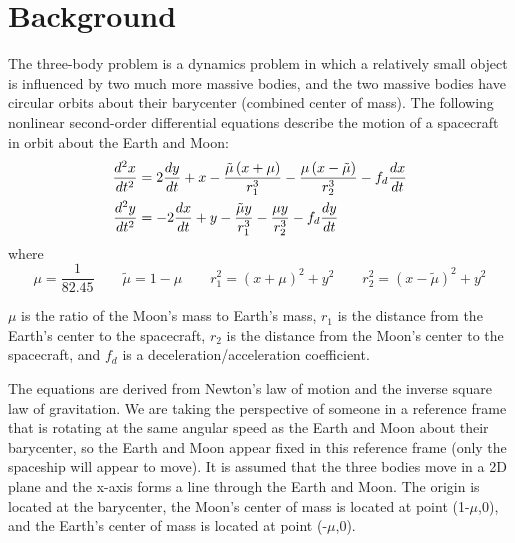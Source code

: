\section{Background}

The \color{magenta} three-body problem \color{white} is a dynamics problem in which a relatively small object is influenced by two much more massive bodies, and the two massive bodies have circular orbits about their barycenter (combined center of mass). The following nonlinear second-order differential equations describe the motion of a spacecraft in orbit about the Earth and Moon:
\color{cyan}
\begin{align}
    \frac{d^2 x}{dt^2} & = 2\frac{dy}{dt} + x - \frac{\tilde{\mu} \left(x+\mu\right)}{r_1^3} - \frac{\mu \left(x-\tilde{\mu}\right)}{r_2^3} - f_d \frac{dx}{dt}
    \label{eq:ODE1}                                                                                                                                          \\
    \frac{d^2 y}{dt^2} & = -2\frac{dx}{dt} + y - \frac{\tilde{\mu}y}{r_1^3} - \frac{\mu y}{r_2^3} - f_d\frac{dy}{dt}
    \label{eq:ODE2}
\end{align}
\color{white} where
\color{orange}
\begin{equation*}
    \mu = \frac{1}{82.45} \qquad \tilde{\mu} = 1 - \mu \qquad r_1^2 = \left(x+\mu\right)^2 + y^2 \qquad r_2^2 = \left(x-\tilde{\mu}\right)^2 + y^2
\end{equation*}

\color{white}

$\mu$ is the ratio of the Moon's mass to Earth's mass, $r_1$ is the distance from the Earth’s center to the
spacecraft, $r_2$ is the distance from the Moon’s center to the spacecraft, and $f_d$ is a deceleration/acceleration
coefficient.

\vspace{\baselineskip}

The equations are derived from Newton’s law of motion and the inverse square law of gravitation. We are taking the perspective of someone in a reference frame that is rotating at the same angular speed as the Earth and Moon about their barycenter, so the Earth and Moon appear fixed in this reference frame (only the spaceship will appear to move). It is assumed that the three bodies move in a 2D plane and the x-axis forms a line through the Earth and Moon. The origin is located at the barycenter, the Moon’s center of mass is located at point (1-$\mu$,0), and the Earth’s center of mass is located at point (-$\mu$,0).

